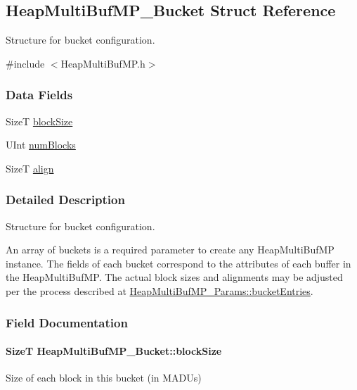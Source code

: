 \subsection{Heap\-Multi\-Buf\-M\-P\-\_\-\-Bucket Struct Reference}
\label{struct_heap_multi_buf_m_p___bucket}


Structure for bucket configuration.  




{\ttfamily \#include $<$Heap\-Multi\-Buf\-M\-P.\-h$>$}

\subsubsection*{Data Fields}
\begin{DoxyCompactItemize}
\item 
Size\-T \hyperlink{struct_heap_multi_buf_m_p___bucket_a9da93c2ee9285ee0c68781f1f31d5097}{block\-Size}
\item 
U\-Int \hyperlink{struct_heap_multi_buf_m_p___bucket_aae58960c7220dbf07d8eb41f09083b1c}{num\-Blocks}
\item 
Size\-T \hyperlink{struct_heap_multi_buf_m_p___bucket_a0ca1421d9f65451f797e07811cefd80a}{align}
\end{DoxyCompactItemize}


\subsubsection{Detailed Description}
Structure for bucket configuration. 

An array of buckets is a required parameter to create any Heap\-Multi\-Buf\-M\-P instance. The fields of each bucket correspond to the attributes of each buffer in the Heap\-Multi\-Buf\-M\-P. The actual block sizes and alignments may be adjusted per the process described at \hyperlink{struct_heap_multi_buf_m_p___params_ac130e0ad7fad30d9c759af90984dee8b}{Heap\-Multi\-Buf\-M\-P\-\_\-\-Params\-::bucket\-Entries}. 

\subsubsection{Field Documentation}
\paragraph[{block\-Size}]{\setlength{\rightskip}{0pt plus 5cm}Size\-T Heap\-Multi\-Buf\-M\-P\-\_\-\-Bucket\-::block\-Size}\label{struct_heap_multi_buf_m_p___bucket_a9da93c2ee9285ee0c68781f1f31d5097}
Size of each block in this bucket (in M\-A\-D\-Us) 
